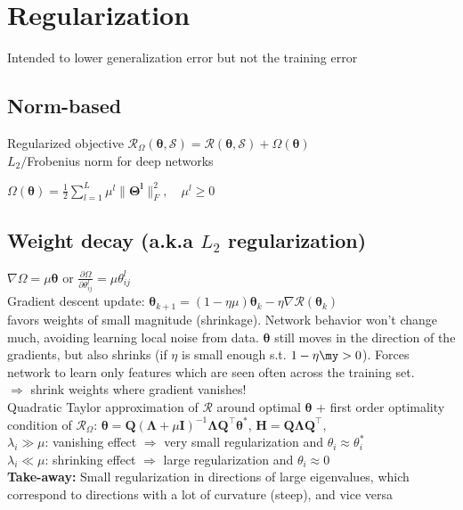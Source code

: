 \section*{Regularization}
Intended to lower generalization error but not the training error
\subsection*{Norm-based}
Regularized objective
$\mathcal{R}_{\Omega}(\pmb{\theta},\mathcal{S}) = \mathcal{R}(\pmb{\theta},\mathcal{S}) + \Omega(\pmb{\theta})$\\
$L_2/$Frobenius norm for deep networks

$\Omega(\pmb{\theta}) = \frac{1}{2}\sum_{l=1}^L\mu^l\|\pmb{\Theta^l}\|_F^2, \quad \mu^l\geq 0$

\subsection*{Weight decay (a.k.a $L_2$ regularization)}
$\nabla\Omega = \mu\pmb{\theta}$ or $\frac{\partial\Omega}{\partial \theta_{ij}^l} = \mu\theta_{ij}^l$ \\
Gradient descent update:
$\pmb{\theta}_{k+1} = (1-\eta\mu)\pmb{\theta}_k - \eta \nabla\mathcal{R}(\pmb{\theta}_k) $ \\ favors weights of small magnitude (shrinkage). Network behavior won't change much, avoiding learning local noise from data. $\pmb\theta$ still moves in the direction of the gradients, but also shrinks (if $\eta$ is small enough s.t. $1 -\eta \my > 0$). Forces network to learn only features which are seen often across the training set.\\
$\Rightarrow$ shrink weights where gradient vanishes!\\
Quadratic Taylor approximation of $\mathcal{R}$ around optimal $\pmb{\theta}$ + first order optimality condition of $\mathcal{R}_{\Omega}$:
$\pmb{\theta} = \mathbf{Q}(\mathbf{\Lambda}+\mu\mathbf{I})^{-1}\mathbf{\Lambda}\mathbf{Q}^{\intercal}\pmb{\theta}^*$,
$\mathbf{H}=\mathbf{Q\Lambda}\mathbf{Q}^{\intercal}$,\\
$\lambda_i\gg\mu$: vanishing effect $\Rightarrow$ very small regularization and $\theta_i\approx\theta_i^*$\\
$\lambda_i\ll\mu$: shrinking effect $\Rightarrow$ large regularization and $\theta_i\approx 0$\\
\textbf{Take-away:} Small regularization in directions of large eigenvalues, which correspond to directions with a lot of curvature (steep), and vice versa\\
